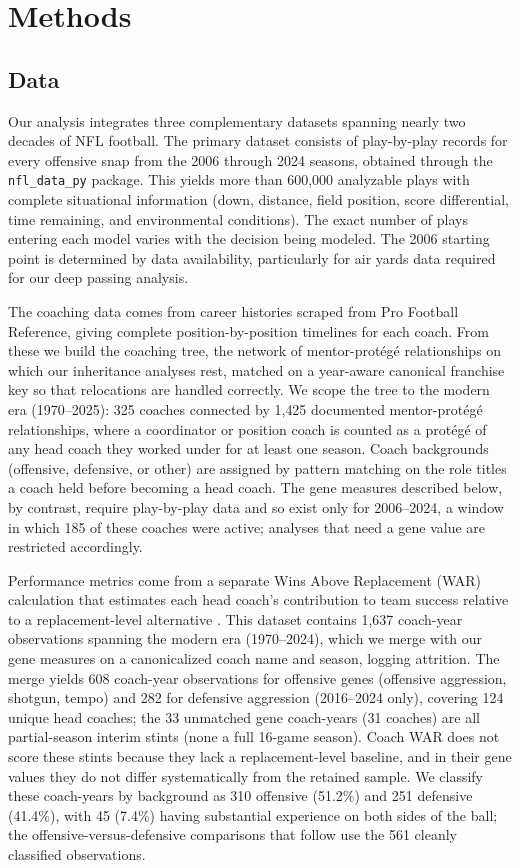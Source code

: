 \documentclass[USenglish]{article}
\theoremstyle{dgthm}
\theoremstyle{dgdef}
\begin{document}
\section{Methods}

\subsection{Data}

Our analysis integrates three complementary datasets spanning nearly two decades of NFL football. The primary dataset consists of play-by-play records for every offensive snap from the 2006 through 2024 seasons, obtained through the \texttt{nfl\_data\_py} package. This yields more than 600,000 analyzable plays with complete situational information (down, distance, field position, score differential, time remaining, and environmental conditions). The exact number of plays entering each model varies with the decision being modeled. The 2006 starting point is determined by data availability, particularly for air yards data required for our deep passing analysis.

The coaching data comes from career histories scraped from Pro Football Reference, giving complete position-by-position timelines for each coach. From these we build the coaching tree, the network of mentor-protégé relationships on which our inheritance analyses rest, matched on a year-aware canonical franchise key so that relocations are handled correctly. We scope the tree to the modern era (1970--2025): 325 coaches connected by 1{,}425 documented mentor-protégé relationships, where a coordinator or position coach is counted as a protégé of any head coach they worked under for at least one season. Coach backgrounds (offensive, defensive, or other) are assigned by pattern matching on the role titles a coach held before becoming a head coach. The gene measures described below, by contrast, require play-by-play data and so exist only for 2006--2024, a window in which 185 of these coaches were active; analyses that need a gene value are restricted accordingly.

Performance metrics come from a separate Wins Above Replacement (WAR) calculation that estimates each head coach's contribution to team success relative to a replacement-level alternative \citep{williamson2026war}. This dataset contains 1,637 coach-year observations spanning the modern era (1970--2024), which we merge with our gene measures on a canonicalized coach name and season, logging attrition. The merge yields 608 coach-year observations for offensive genes (offensive aggression, shotgun, tempo) and 282 for defensive aggression (2016--2024 only), covering 124 unique head coaches; the 33 unmatched gene coach-years (31 coaches) are all partial-season interim stints (none a full 16-game season). Coach WAR does not score these stints because they lack a replacement-level baseline, and in their gene values they do not differ systematically from the retained sample. We classify these coach-years by background as 310 offensive (51.2\%) and 251 defensive (41.4\%), with 45 (7.4\%) having substantial experience on both sides of the ball; the offensive-versus-defensive comparisons that follow use the 561 cleanly classified observations.
\end{document}
